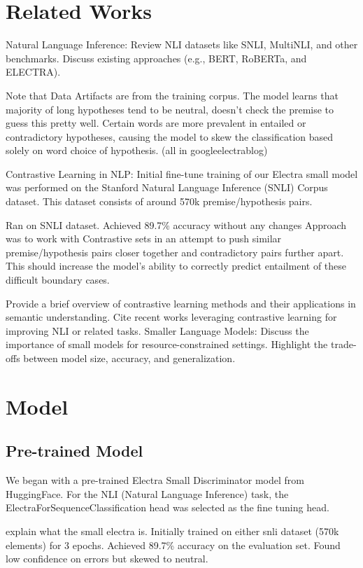 \documentclass[11pt]{article}
\begin{document}
\section{Related Works}
Natural Language Inference:
Review NLI datasets like SNLI, MultiNLI, and other benchmarks.
Discuss existing approaches (e.g., BERT, RoBERTa, and ELECTRA).

Note that Data Artifacts are from the training corpus. The model learns that majority of long hypotheses tend to be neutral, doesn't check the premise to guess this pretty well. Certain words are more prevalent in entailed or contradictory hypotheses, causing the model to skew the classification based solely on word choice of hypothesis.  (all in googleelectrablog)

Contrastive Learning in NLP:
Initial fine-tune training of our Electra small model was performed on the Stanford Natural Language Inference (SNLI) Corpus dataset. This dataset consists of around 570k premise/hypothesis pairs. \citealp{snlicorpus}

Ran on SNLI dataset. Achieved 89.7\% accuracy without any changes
Approach was to work with Contrastive sets in an attempt to push similar premise/hypothesis pairs closer together and contradictory pairs further apart. This should increase the model's ability to correctly predict entailment of these difficult boundary cases.

Provide a brief overview of contrastive learning methods and their applications in semantic understanding.
Cite recent works leveraging contrastive learning for improving NLI or related tasks.
Smaller Language Models:
Discuss the importance of small models for resource-constrained settings.
Highlight the trade-offs between model size, accuracy, and generalization.

\section{Model}
\subsection{Pre-trained Model}

We began with a pre-trained Electra Small Discriminator model from HuggingFace. For the NLI (Natural Language Inference) task, the ElectraForSequenceClassification head was selected as the fine tuning head. 

explain what the small electra is.
Initially trained on either snli dataset (570k elements) for 3 epochs. Achieved 89.7\% accuracy on the evaluation set. Found low confidence on errors but skewed to neutral.
\end{document}
